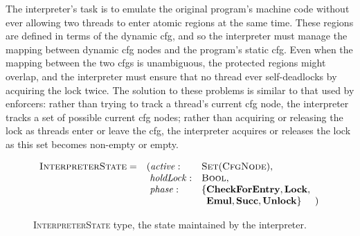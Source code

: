  The interpreter's task is to emulate the original
program's machine code without ever allowing two threads to enter
atomic regions at the same time.  These regions are defined in terms
of the dynamic \gls{cfg}, and so the interpreter must manage the
mapping between dynamic \gls{cfg} nodes and the program's static
\gls{cfg}.  Even when the mapping between the two \glspl{cfg} is
unambiguous, the protected regions might overlap, and the interpreter
must ensure that no thread ever self-deadlocks by acquiring the lock
twice.  The solution to these problems is similar to that used by
enforcers: rather than trying to track a thread's current \gls{cfg}
node, the interpreter tracks a set of possible current \gls{cfg}
nodes; rather than acquiring or releasing the lock as threads enter or
leave the \gls{cfg}, the interpreter acquires or releases the lock as
this set becomes non-empty or empty.

\begin{figure}
  \begin{displaymath}
    \begin{array}{llll}
      \textsc{InterpreterState} = & (\mathit{active}: &\textsc{Set}(\textsc{CfgNode}), &\\
      & \,\,\mathit{holdLock}: &\textsc{Bool},\\
      & \,\,\mathit{phase}: & \{\mathbf{CheckForEntry}, \mathbf{Lock}, \\
      &                     & \,\,\,\mathbf{Emul}, \mathbf{Succ}, \mathbf{Unlock}\} &\!\!\!)\\
    \end{array}
  \end{displaymath}
  \caption{\textsc{InterpreterState} type, the state maintained by the
    interpreter.}
  \label{fig:fix_bugs:interpreter_state}
\end{figure}

